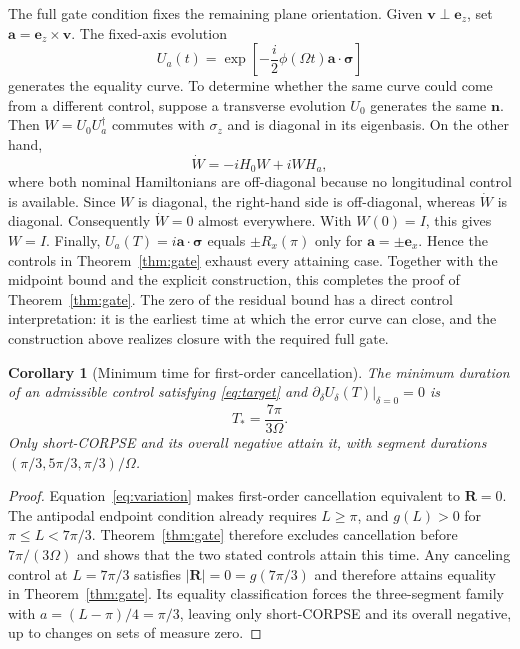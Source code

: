 \documentclass[12pt]{iopjournal}
\newtheorem{corollary}{Corollary}
\newcommand{\nvec}{\mathbf n}
\newcommand{\Rvec}{\mathbf R}
\newcommand{\vvec}{\mathbf v}
\newcommand{\ez}{\mathbf e_z}
\newcommand{\sigmavec}{\boldsymbol\sigma}
\begin{document}
The full gate condition fixes the remaining plane orientation. Given
$\vvec\perp\ez$, set $\mathbf a=\ez\times\vvec$. The fixed-axis
evolution
\begin{equation*}
 U_a(t)=\exp\left[-\frac{i}{2}\phi(\Omega t)
                  \mathbf a\cdot\sigmavec\right]
\end{equation*}
generates the equality curve. To determine whether the same curve
could come from a different control, suppose a transverse evolution $U_0$
generates the same $\nvec$. Then $W=U_0U_a^\dagger$ commutes with
$\sigma_z$ and is diagonal in its eigenbasis. On the other hand,
\begin{equation}
 \dot W=-iH_0W+iWH_a,
 \label{eq:lift-uniqueness}
\end{equation}
where both nominal Hamiltonians are off-diagonal because no
longitudinal control is available. Since $W$ is diagonal, the
right-hand side is off-diagonal, whereas $\dot W$ is diagonal.
Consequently $\dot W=0$ almost
everywhere. With $W(0)=I$, this gives $W=I$. Finally,
$U_a(T)=i\mathbf a\cdot\sigmavec$ equals $\pm R_x(\pi)$ only for
$\mathbf a=\pm\mathbf e_x$. Hence the controls in
Theorem~\ref{thm:gate} exhaust every attaining case. Together with the
midpoint bound and the explicit construction, this completes the proof
of Theorem~\ref{thm:gate}. The zero of the residual bound has a direct control interpretation:
it is the earliest time at which the error curve can close, and the
construction above realizes closure with the required full gate.

\begin{corollary}[Minimum time for first-order cancellation]
\label{cor:robust-time}
The minimum duration of an admissible control satisfying
\eqref{eq:target} and
$\left.\partial_\delta U_\delta(T)\right|_{\delta=0}=0$ is
\begin{equation}
 T_* = \frac{7\pi}{3\Omega}.
 \label{eq:robust-time}
\end{equation}
Only short-CORPSE and its overall negative attain it, with segment
durations $(\pi/3,5\pi/3,\pi/3)/\Omega$.
\end{corollary}

\begin{proof}
Equation~\eqref{eq:variation} makes first-order cancellation equivalent
to $\Rvec=0$. The antipodal endpoint condition already requires
$L\ge\pi$, and $g(L)>0$ for $\pi\le L<7\pi/3$.
Theorem~\ref{thm:gate} therefore excludes cancellation before
$7\pi/(3\Omega)$ and shows that the two stated controls attain this
time. Any canceling control at $L=7\pi/3$ satisfies
$|\Rvec|=0=g(7\pi/3)$ and therefore attains equality in
Theorem~\ref{thm:gate}. Its equality classification forces the
three-segment family with $a=(L-\pi)/4=\pi/3$, leaving only
short-CORPSE and its overall negative, up to changes on sets of
measure zero.
\end{proof}
\end{document}
